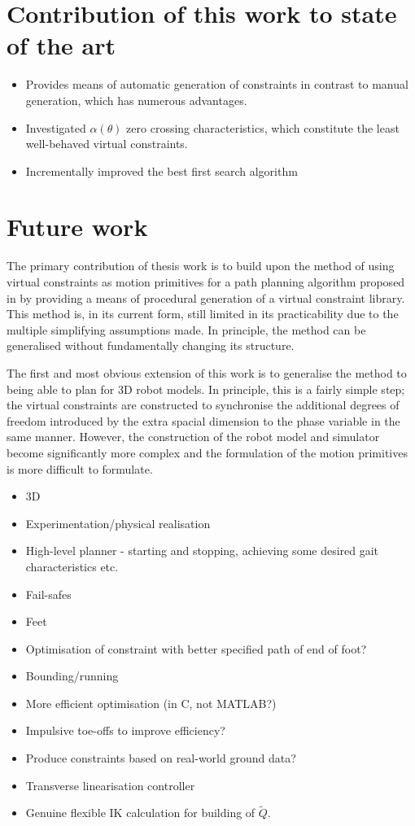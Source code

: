 \section{Contribution of this work to state of the art}
\begin{itemize}
	\item Provides means of automatic generation of constraints in contrast to manual generation, which has numerous advantages.
	\item Investigated $\alpha(\theta)$ zero crossing characteristics, which constitute the least well-behaved virtual constraints.
	\item Incrementally improved the best first search algorithm
\end{itemize}

\section{Future work}
The primary contribution of thesis work is to build upon the method of using virtual constraints as motion primitives for a path planning algorithm proposed in \cite{manchester13planning} by providing a means of procedural generation of a virtual constraint library. This method is, in its current form, still limited in its practicability due to the multiple simplifying assumptions made. In principle, the method can be generalised without fundamentally changing its structure.

The first and most obvious extension of this work is to generalise the method to being able to plan for 3D robot models. In principle, this is a fairly simple step; the virtual constraints are constructed to synchronise the additional degrees of freedom introduced by the extra spacial dimension to the phase variable in the same manner. However, the construction of the robot model and simulator become significantly more complex and the formulation of the motion primitives is more difficult to formulate.



\begin{itemize}
	\item 3D
	\item Experimentation/physical realisation
	\item High-level planner - starting and stopping, achieving some desired gait characteristics etc.
	\item Fail-safes
	\item Feet
	\item Optimisation of constraint with better specified path of end of foot?
	\item Bounding/running
	\item More efficient optimisation (in C, not MATLAB?)
	\item Impulsive toe-offs to improve efficiency?
	\item Produce constraints based on real-world ground data?
	\item Transverse linearisation controller
	\item Genuine flexible IK calculation for building of $\tilde{Q}$.
\end{itemize}